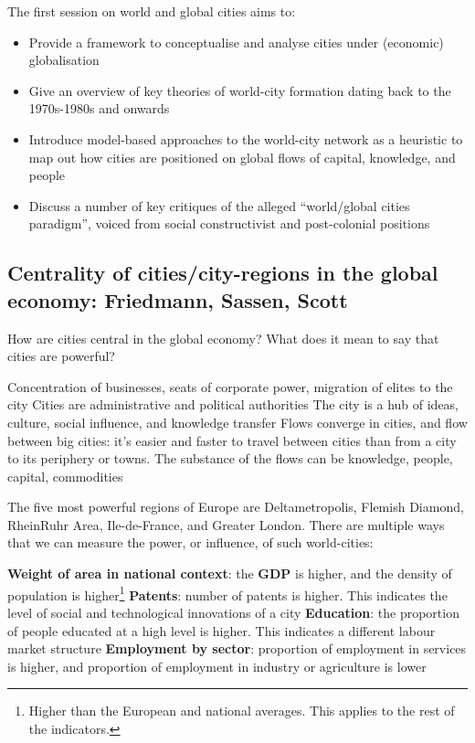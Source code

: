 \documentclass{article}
\begin{document}
The first session on world and global cities aims to:
\begin{itemize}
  \item Provide a framework to conceptualise and analyse cities under (economic) globalisation
  \item Give an overview of key theories of world-city formation dating back to the 1970s-1980s and onwards
  \item Introduce model-based approaches to the world-city network as a heuristic to map out how cities are positioned on global flows of capital, knowledge, and people
  \item Discuss a number of key critiques of the alleged ``world/global cities paradigm'', voiced from social constructivist and post-colonial positions
\end{itemize}

\subsection{Centrality of cities/city-regions in the global economy: Friedmann, Sassen, Scott}

How are cities central in the global economy? What does it mean to say that cities are powerful? 

\begin{outline}
	\1 Concentration of businesses, seats of corporate power, migration of elites to the city
	\1 Cities are administrative and political authorities
	\1 The city is a hub of ideas, culture, social influence, and knowledge transfer
	\1 Flows converge in cities, and flow between big cities: it's easier and faster to travel between cities than from a city to its periphery or towns. The substance of the flows can be knowledge, people, capital, commodities
\end{outline}

The five most powerful regions of Europe are Deltametropolis, Flemish Diamond, RheinRuhr Area, Ile-de-France, and Greater London.
There are multiple ways that we can measure the power, or influence, of such world-cities:

\begin{outline}
	\1 \textbf{Weight of area in national context}: the \textbf{GDP} is higher, and the density of population is higher\footnote{Higher than the European and national averages. This applies to the rest of the indicators.}
	\1 \textbf{Patents}: number of patents is higher. This indicates the level of social and technological innovations of a city
	\1 \textbf{Education}: the proportion of people educated at a high level is higher. This indicates a different labour market structure
	\1 \textbf{Employment by sector}: proportion of employment in services is higher, and proportion of employment in industry or agriculture is lower
\end{outline}
\end{document}
